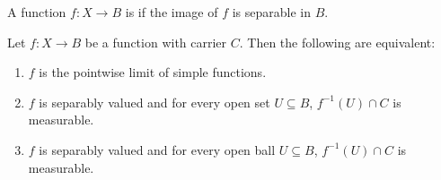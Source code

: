 \begin{definition}
A function $f: X \to B$ is  if the image of $f$ is separable in $B$.
\end{definition}

\begin{lemma}
\label{Newberger lemma 2}
Let $f: X \to B$ be a function with carrier $C$. Then the following are equivalent:
\begin{enumerate}
\item $f$ is the pointwise limit of simple functions.
\item $f$ is separably valued and for every open set $U \subseteq B$, $f^{-1}(U) \cap C$ is measurable.
\item $f$ is separably valued and for every open ball $U \subseteq B$, $f^{-1}(U) \cap C$ is measurable.
\end{enumerate}
\end{lemma}
